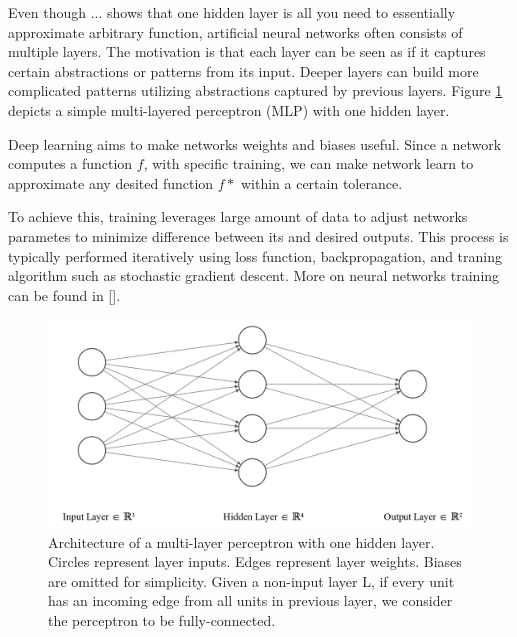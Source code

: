 Even though ... shows that one hidden layer is all you need to essentially approximate arbitrary function, artificial neural networks often consists of multiple layers. The motivation is that each layer can be seen as if it captures certain abstractions or patterns from its input. Deeper layers can build more complicated patterns utilizing abstractions captured by previous layers. Figure \ref{fig:simple-mlp} depicts a simple multi-layered perceptron (MLP) with one hidden layer.

Deep learning aims to make networks weights and biases useful. Since a network computes a function $f$, with specific training, we can make network learn to approximate any desited function $f*$ within a certain tolerance.

To achieve this, training leverages large amount of data to adjust networks parametes to minimize difference between its and desired outputs. This process is typically performed iteratively using loss function, backpropagation, and traning algorithm such as stochastic gradient descent. More on neural networks training can be found in [].


\begin{figure}[!h]
    \begin{center}
    \begin{minipage}{.75\textwidth}
      \includegraphics[width=\textwidth]{img/nn.png}
    \end{minipage}
    \caption{Architecture of a multi-layer perceptron with one hidden layer. Circles represent layer inputs. Edges represent layer weights. Biases are omitted for simplicity. Given a non-input layer L, if every unit has an incoming edge from all units in previous layer, we consider the perceptron to be fully-connected.}
    \label{fig:simple-mlp}
    \end{center}
\end{figure}

